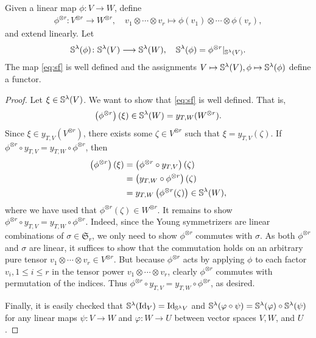 \documentclass[11pt]{amsart}
\begin{document}
\begin{prop}
Given a linear map \(\phi \colon V \rightarrow W\), define 
\begin{align}
    \phi^{\otimes r}\colon V^{\otimes r} \longrightarrow W^{\otimes r}, \quad v_1 \otimes \cdots \otimes v_r \longmapsto \phi(v_1) \otimes \cdots \otimes \phi(v_r),
\end{align}
and extend linearly. Let
\begin{align}
\mathbb{S}^\lambda(\phi)\colon \mathbb{S}^\lambda(V) \longrightarrow  \mathbb{S}^\lambda(W
), \quad \mathbb{S}^\lambda(\phi)=\phi^{\otimes r}|_{\mathbb{S}^\lambda(V)}. \label{eq:sf}
\end{align}
The map \cref{eq:sf} is well defined and the assignments 
$V \mapsto \mathbb{S}^\lambda(V), \phi \mapsto \mathbb{S}^\lambda(\phi)$
define a functor.
\end{prop}
\begin{proof}
Let $\xi \in \mathbb{S}^\lambda(V)$. We want to show that \cref{eq:sf} is well defined. That is,  
\begin{align*}
    \left(\phi^{\otimes r}\right)(\xi) \in \mathbb{S} ^\lambda (W)=y_{T, W}(W^{\otimes r}).
\end{align*}
Since $\xi \in y_{T, V}(V^{\otimes r})$, there exists some $\zeta \in V^{\otimes r}$ such that $\xi=y_{T, V}(\zeta)$. If $\phi^{\otimes r}\circ y_{T, V}= y_{T, W} \circ \phi^{\otimes r}$, then
\begin{align*}
\left(\phi^{\otimes r}\right) (\xi) &=\left(\phi^{\otimes r}\circ y_{T, V}\right)(\zeta) \\
&= \left(y_{T, W} \circ \phi^{\otimes r}\right)(\zeta) \\
&= y_{T, W} \left( \phi^{\otimes r}(\zeta)\right) \in \mathbb{S}^\lambda(W),
\end{align*}
where we have used that $\phi^{\otimes r}(\zeta) \in W^{\otimes r}$. 
It remains to show $\phi^{\otimes r}\circ y_{T, V}= y_{T, W} \circ \phi^{\otimes r}$. Indeed, since the Young symmetrizers are linear combinations of $\sigma \in \mathfrak{S}_r$, we only need to show $\phi^{\otimes r}$ commutes with $\sigma$. As both $\phi^{\otimes r}$ and $\sigma$ are linear, it suffices to show that the commutation holds on an arbitrary pure tensor $v_1 \otimes \cdots \otimes v_r \in V^{\otimes r}$. But because $\phi^{\otimes r}$ acts by applying $\phi$ to each factor $v_i, 1 \leq i \leq r$ in the tensor power $v_1 \otimes \cdots \otimes v_r$, clearly $\phi^{\otimes r}$ commutes with permutation of the indices. Thus $\phi^{\otimes r}\circ y_{T, V}= y_{T, W} \circ \phi^{\otimes r}$, as desired. 

Finally, it is easily checked that \(\mathbb{S}^\lambda (\mathrm{Id}_V) = \mathrm{Id}_{\mathbb{S}^\lambda V}\) and \(\mathbb{S}^\lambda (\varphi \circ \psi ) = \mathbb{S}^\lambda(\varphi) \circ \mathbb{S}^\lambda (\psi)\) for any linear maps \(\psi \colon V \rightarrow W\) and \(\varphi \colon W \rightarrow U\) between vector spaces \(V,W\), and \(U\).
\end{proof}
\end{document}
